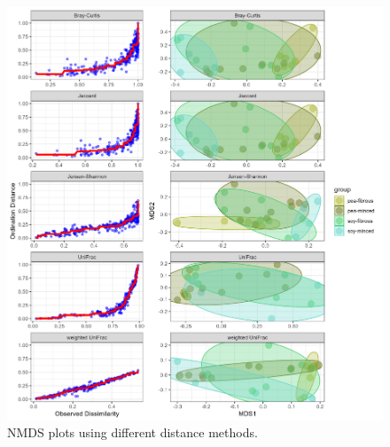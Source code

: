 \documentclass[preprint, 3p,
authoryear]{elsarticle} %
\begin{document}
\begin{figure}

{\centering \includegraphics[width=1\linewidth]{NMDSplots} 

}

\caption{\label{figSM2} NMDS plots using different distance methods.  }\label{fig:figSM2}
\end{figure}
\end{document}
